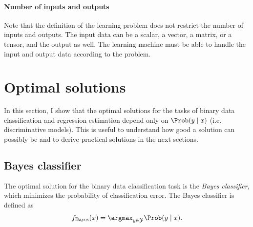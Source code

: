 \paragraph{Number of inputs and outputs}
Note that the definition of the learning problem does not restrict the number of inputs
and outputs.  The input data can be a scalar, a vector, a matrix, or a tensor, and the
output as well.  The learning machine must be able to handle the input and output data
according to the problem.


\section{Optimal solutions}
\label{sec:optimal-solution}

In this section, I show that the optimal solutions for the tasks of binary data
classification and regression estimation depend only on $\Prob(y \mid x)$ (i.e.
discriminative models).  This is useful
to understand how good a solution can possibly be and to derive practical solutions in the
next sections.

\subsection{Bayes classifier}

The optimal solution for the binary data classification task is the \emph{Bayes
classifier}, which minimizes the probability of classification error.  The Bayes
classifier is defined as
\begin{equation*}
  f_\text{Bayes}(x) = \argmax_{y \in \mathcal{Y}} \Prob(y \mid x)\text{.}
\end{equation*}

